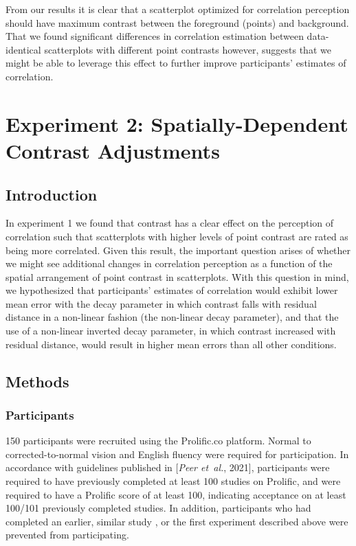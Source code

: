 \documentclass[preprint, 3p,
authoryear]{elsarticle} %
\newcommand{\ldiffentity}[1]{#1}
\providecommand{\DIFaddtex}[1]{{\protect\color{blue}\uwave{#1}}} %
\providecommand{\DIFaddbegin}{} %
\providecommand{\DIFaddend}{} %
\providecommand{\DIFadd}[1]{\texorpdfstring{\DIFaddtex{#1}}{#1}} %
\newcommand{\DIFaddincludegraphics}[2][]{{\color{blue}\fbox{\DIFOincludegraphics[#1]{#2}}}} %
\DeclareRobustCommand{\DIFaddbegin}{\DIFOaddbegin \let\includegraphics\DIFaddincludegraphics} %
\DeclareRobustCommand{\DIFaddend}{\DIFOaddend \let\includegraphics\DIFOincludegraphics} %
\begin{document}
From our results it is clear that a scatterplot optimized for
correlation perception should have maximum contrast between the
foreground (points) and background. That we found significant
differences in correlation estimation between data-identical
scatterplots with different point contrasts however, suggests that we
might be able to leverage this effect to further improve participants'
estimates of correlation.

\hypertarget{experiment-2-spatially-dependent-contrast-adjustments}{%
\section{Experiment 2: Spatially-Dependent Contrast
Adjustments}\label{experiment-2-spatially-dependent-contrast-adjustments}}

\hypertarget{introduction-2}{%
\subsection{Introduction}\label{introduction-2}}

In experiment 1 we found that contrast has a clear effect on the
perception of correlation such that scatterplots with higher levels of
point contrast are rated as being more correlated. Given this result,
the important question arises of whether we might see additional changes
in correlation perception as a function of the spatial arrangement of
point contrast in scatterplots. With this question in mind, we
hypothesized that participants' estimates of correlation would exhibit
lower mean error with the decay parameter in which contrast falls with
residual distance in a non-linear fashion (the non-linear decay
parameter), and that the use of a non-linear inverted decay parameter,
in which contrast increased with residual distance, would result in
higher mean errors than all other conditions.

\hypertarget{methods}{%
\subsection{Methods}\label{methods}}

\hypertarget{participants-1}{%
\subsubsection{Participants}\label{participants-1}}

150 participants were recruited using the Prolific.co platform. Normal
to corrected-to-normal vision and English fluency were required for
participation. In accordance with guidelines published in
[\ldiffentity{\textit{Peer et~al.}, \ldiffentity{2021}}], participants were required to have previously
completed at least 100 studies on Prolific, and were required to have a
Prolific score of at least 100, indicating acceptance on at least
100/101 previously completed studies. In addition, participants who had
completed an earlier, similar study \DIFaddbegin \DIFadd{that was run by the authors of the
current paper}\DIFaddend , or the first experiment described above were prevented
from participating.
\end{document}
